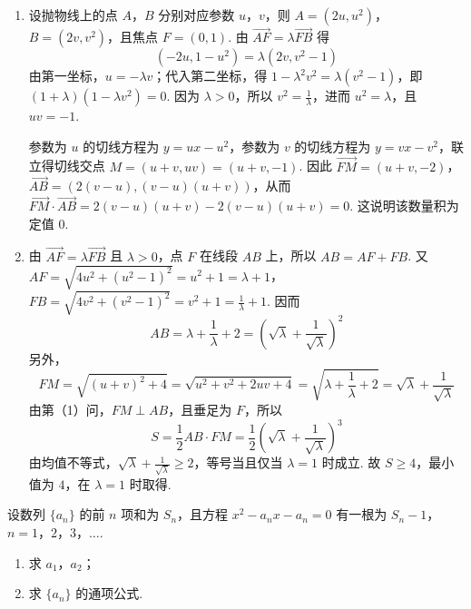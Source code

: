 \begin{solution}
\begin{enumerate}
\item 设抛物线上的点 \(A\)，\(B\) 分别对应参数 \(u\)，\(v\)，则
\(A=(2u,u^2)\)，\(B=(2v,v^2)\)，且焦点 \(F=(0,1)\). 由 \(\overrightarrow{AF}=\lambda\overrightarrow{FB}\) 得
\[
(-2u,1-u^2)=\lambda(2v,v^2-1)
\]
由第一坐标，\(u=-\lambda v\)；代入第二坐标，得
\(1-\lambda^2v^2=\lambda(v^2-1)\)，即 \((1+\lambda)(1-\lambda v^2)=0\). 因为 \(\lambda>0\)，所以 \(v^2=\frac1\lambda\)，进而 \(u^2=\lambda\)，且 \(uv=-1\).

参数为 \(u\) 的切线方程为 \(y=ux-u^2\)，参数为 \(v\) 的切线方程为 \(y=vx-v^2\)，联立得切线交点 \(M=(u+v,uv)=(u+v,-1)\). 因此
\(\overrightarrow{FM}=(u+v,-2)\)，\(\overrightarrow{AB}=(2(v-u),(v-u)(u+v))\)，从而
\(\overrightarrow{FM}\cdot\overrightarrow{AB}=2(v-u)(u+v)-2(v-u)(u+v)=0\). 这说明该数量积为定值 \(0\).
\item 由 \(\overrightarrow{AF}=\lambda\overrightarrow{FB}\) 且 \(\lambda>0\)，点 \(F\) 在线段 \(AB\) 上，所以 \(AB=AF+FB\). 又
\(AF=\sqrt{4u^2+(u^2-1)^2}=u^2+1=\lambda+1\)，\(FB=\sqrt{4v^2+(v^2-1)^2}=v^2+1=\frac1\lambda+1\). 因而
\[
AB=\lambda+\frac1\lambda+2=\left(\sqrt\lambda+\frac1{\sqrt\lambda}\right)^2
\]
另外，
\[
FM=\sqrt{(u+v)^2+4}=\sqrt{u^2+v^2+2uv+4}=\sqrt{\lambda+\frac1\lambda+2}=\sqrt\lambda+\frac1{\sqrt\lambda}
\]
由第（1）问，\(FM\perp AB\)，且垂足为 \(F\)，所以
\[
S=\frac12AB\cdot FM=\frac12\left(\sqrt\lambda+\frac1{\sqrt\lambda}\right)^3
\]
由均值不等式，\(\sqrt\lambda+\frac1{\sqrt\lambda}\geq2\)，等号当且仅当 \(\lambda=1\) 时成立. 故 \(S\geq4\)，最小值为 \(4\)，在 \(\lambda=1\) 时取得.
\end{enumerate}
\end{solution}

\begin{problem}
设数列 \(\{a_{n}\}\) 的前 \(n\) 项和为 \(S_{n}\)，且方程 \(x^{2} - a_{n}x - a_{n} = 0\) 有一根为 \(S_{n} - 1\)，\(n = 1\)，\(2\)，\(3\)，\(\dots\).

\begin{enumerate}
\item 求 \(a_{1}\)，\(a_{2}\)；
\item 求 \(\{a_{n}\}\) 的通项公式.
\end{enumerate}
\end{problem}

